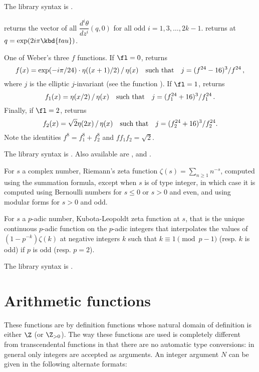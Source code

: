 The library syntax is .

 returns the vector
of all $\dfrac{d^i\theta}{dz^i}(q,0)$ for all odd $i = 1, 3, \dots, 2k-1$.
 returns
 at $q = \exp(2i\pi \kbd{tau})$.

\label{se:weber}
One of Weber's three $f$ functions.
If $\fl=0$, returns
$$f(x)=\exp(-i\pi/24)\cdot\eta((x+1)/2)\,/\,\eta(x) \quad\hbox{such that}\quad
j=(f^{24}-16)^3/f^{24}\,,$$
where $j$ is the elliptic $j$-invariant  (see the function ).
If $\fl=1$, returns
$$f_1(x)=\eta(x/2)\,/\,\eta(x)\quad\hbox{such that}\quad
j=(f_1^{24}+16)^3/f_1^{24}\,.$$
Finally, if $\fl=2$, returns
$$f_2(x)=\sqrt{2}\eta(2x)\,/\,\eta(x)\quad\hbox{such that}\quad
j=(f_2^{24}+16)^3/f_2^{24}.$$
Note the identities $f^8=f_1^8+f_2^8$ and $ff_1f_2=\sqrt2$.

The library syntax is .
Also available are ,
 and .

\label{se:zeta}
For $s$ a complex number, Riemann's zeta
function  $\zeta(s)=\sum_{n\ge1}n^{-s}$,
computed using the  summation formula, except
when $s$ is of type integer, in which case it is computed using
Bernoulli numbers for $s\le0$ or $s>0$ and
even, and using modular forms for $s>0$ and odd.

For $s$ a $p$-adic number, Kubota-Leopoldt zeta function at $s$, that
is the unique continuous $p$-adic function on the $p$-adic integers
that interpolates the values of $(1 - p^{-k}) \zeta(k)$ at negative
integers $k$ such that $k \equiv 1 \pmod{p-1}$ (resp. $k$ is odd) if
$p$ is odd (resp. $p = 2$).

The library syntax is .

\section{Arithmetic functions}\label{se:arithmetic}

These functions are by definition functions whose natural domain of
definition is either $\Z$ (or $\Z_{>0}$). The way these functions are used is
completely different from transcendental functions in that there are no
automatic type conversions: in general only integers are accepted as
arguments. An integer argument $N$ can be given in the following alternate
formats:

